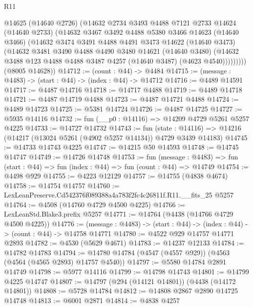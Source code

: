 \begin{lexlean}{R11}
\begin{coremodule}
            @14625
            (@14640 @2726)
            (@14632
              @2734
              @3493
              @4488
              @7121
              @2733
              @14624
              (@14640 @2733)
              (@14632
                @3467
                @3492
                @4488
                @5380
                @3466
                @14623
                (@14640 @3466)
                (@14632
                  @3474
                  @3491
                  @4488
                  @4491
                  @3473
                  @14622
                  (@14640 @3473)
                  (@14632
                    @3481
                    @3490
                    @4488
                    @4490
                    @3480
                    @14621
                    (@14640 @3480)
                    (@14632 @3488 @123 @4488 @4488 @3487 @4257 (@14640 @3487) (@4623 @4540)))))))))
      (@8005 @14628))
@14712 := (count : @44) -> @4484
@14715 := (message : @4483) -> (start : @44) -> (index : @44) -> @14712
@14716 := @4489 @14591
@14717 := @4487 @14716
@14718 := @14717 @4488
@14719 := @4489 @14718
@14721 := @4487 @14719 @4488
@14723 := @4487 @14721 @4488
@14724 := @4489 @14723
@14725 := @5381 @14724
@14726 := @4487 @14725
@14727 := @5935 @14116
@14732 := fun (__p0 : @14116) => @14209 @4729 @5261 @5257 @4225
@14733 := @14727 @14732
@14743 := fun (state : @14116) =>
  @14216 (@14217 (@13024 @5261 (@4902 @5257 @14134)) @4729 @3439 @14183)
@14745 := @14733 @14743 @4225
@14747 := @14215 @50 @14593
@14748 := @14745 @14747
@14749 := @14726 @14748
@14753 := fun (message : @4483) =>
  fun (start : @44) => fun (index : @44) => fun (count : @44) => @14749
@14754 := @4498 @929
@14755 := @4223 @12129
@14757 := @14755 (@4838 @4674)
@14758 := @14754 @14757
@14760 := LexLeanPreserve.Cd542376f089388a4a783f2fc4c26811f.R11.__fits_25 @5257
@14764 := @4508 (@14760 @4729 @4500 @4225)
@14766 := LexLeanStd.Blake3.prefix @5257
@14771 := @14764 (@4438 (@14766 @4729 @4500 @4225))
@14776 := (message : @4483) -> (start : @44) -> (index : @44) -> (count : @44) -> @14758 @14771
@14780 := @4522 @929 @14757 @14771 @2893
@14782 := @4530 (@5629 @4671)
@14783 := @14237 @12133
@14784 := @14782 @14783
@14794 := @14780 @14784 (@4547 (@4557 @929)) (@4563 (@4564 (@4565 @2893) @14757 @4540))
@14797 := @5580 @14784 @2891 @14749
@14798 := @5977 @14116
@14799 := @14798 @14743
@14801 := @14799 @4225 @14747
@14807 := @14797 (@294 (@14121 @14801)) (@4438 (@14172 @14801))
@14808 := @5728 @14784
@14812 := @14808 @2867 @2890 @14725 @14748
@14813 := @6001 @2871
@14814 := @4838 @4257

\end{coremodule}
\end{lexlean}
